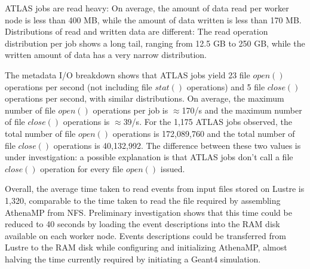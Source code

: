ATLAS jobs are read heavy: On average, the amount of data read per worker
node is less than 400 MB, while the amount of data written is less than 170
MB\@. Distributions of read and written data are different: The read
operation distribution per job shows a long tail, ranging from 12.5 GB to 250
GB, while the written amount of data has a very narrow distribution.

The metadata I/O breakdown shows that ATLAS jobs yield 23 file \(open()\)
operations per second (not including file \(stat()\) operations) and 5 file
\(close()\) operations per second, with similar distributions. On average,
the maximum number of file \(open()\) operations per job is \(\approx\)170/s
and the maximum number of file \(close()\) operations is \(\approx\)39/s. For
the 1,175 ATLAS jobs observed, the total number of file \(open()\) operations
is 172,089,760 and the total number of file \(close()\) operations is
40,132,992. The difference between these two values is under investigation: a
possible explanation is that ATLAS jobs don't call a file
\(close()\) operation for every file \(open()\) issued.

Overall, the average time taken to read events from input files stored on
Lustre is 1,320, comparable to the time taken to read the file required by
assembling AthenaMP from NFS\@. Preliminary investigation shows that this
time could be reduced to 40 seconds by loading the event descriptions into
the RAM disk available on each worker node. Events descriptions could be
transferred from Lustre to the RAM disk while configuring and initializing
AthenaMP, almost halving the time currently required by initiating a Geant4
simulation.